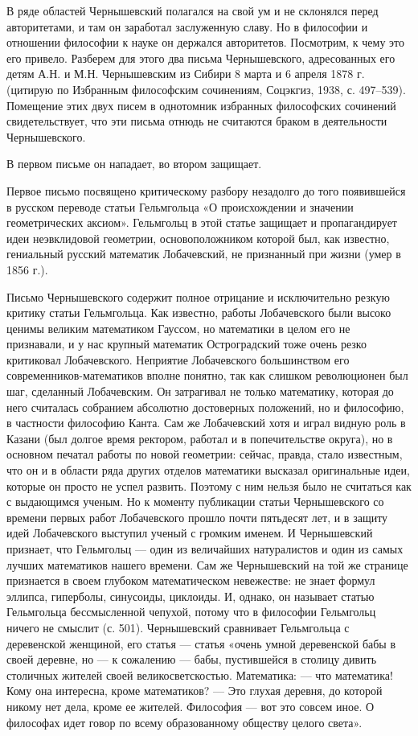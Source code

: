 В ряде областей Чернышевский полагался на свой ум и не склонялся перед
авторитетами, и там  он заработал заслуженную славу. Но  в философии и
отношении  философии к  науке  он держался  авторитетов. Посмотрим,  к
чему это  его привело.  Разберем для  этого два  письма Чернышевского,
адресованных его детям А.Н. и М.Н.  Чернышевским из Сибири 8 марта и 6
апреля 1878 г. (цитирую по Избранным философским сочинениям, Соцэкгиз,
1938, с. 497--539).  Помещение этих двух писем  в однотомник избранных
философских  сочинений  свидетельствует,  что  эти  письма  отнюдь  не
считаются браком в деятельности Чернышевского.

В первом письме он нападает, во втором защищает.

Первое  письмо  посвящено  критическому   разбору  незадолго  до  того
появившейся в  русском переводе статьи Гельмгольца  «О происхождении и
значении геометрических  аксиом». Гельмгольц в этой  статье защищает и
пропагандирует идеи  неэвклидовой геометрии,  основоположником которой
был,  как  известно,  гениальный  русский  математик  Лобачевский,  не
признанный при жизни (умер в 1856 г.).

Письмо Чернышевского содержит полное  отрицание и исключительно резкую
критику  статьи Гельмгольца.  Как известно,  работы Лобачевского  были
высоко ценимы великим  математиком Гауссом, но математики  в целом его
не  признавали, и  у нас  крупный математик  Остроградский тоже  очень
резко критиковал Лобачевского. Неприятие Лобачевского большинством его
современников-математиков вполне понятно, так как слишком революционен
был шаг,  сделанный Лобачевским.  Он затрагивал не  только математику,
которая до  него считалась собранием абсолютно  достоверных положений,
но и философию, в частности философию Канта. Сам же Лобачевский хотя и
играл  видную роль  в Казани  (был  долгое время  ректором, работал  и
в  попечительстве  округа), но  в  основном  печатал работы  по  новой
геометрии: сейчас,  правда, стало известным,  что он и в  области ряда
других  отделов  математики  высказал оригинальные  идеи,  которые  он
просто не успел развить. Поэтому с  ним нельзя было не считаться как с
выдающимся  ученым.  Но  к  моменту  публикации  статьи  Чернышевского
со  времени  первых работ  Лобачевского  прошло  почти пятьдесят  лет,
и  в  защиту  идей  Лобачевского выступил  ученый  с  громким  именем.
И  Чернышевский  признает,  что  Гельмгольц  ---  один  из  величайших
натуралистов и  один из самых  лучших математиков нашего  времени. Сам
же  Чернышевский  на  той  же странице  признается  в  своем  глубоком
математическом  невежестве:   не  знает  формул   эллипса,  гиперболы,
синусоиды,  циклоиды.  И,  однако,   он  называет  статью  Гельмгольца
бессмысленной  чепухой, потому  что в  философии Гельмгольц  ничего не
смыслит (с.  501). Чернышевский  сравнивает Гельмгольца  с деревенской
женщиной,  его  статья ---  статья  «очень  умной деревенской  бабы  в
своей  деревне, но  --- к  сожалению ---  бабы, пустившейся  в столицу
дивить столичных жителей своей  великосветскостью. Математика: --- что
математика!  Кому она  интересна,  кроме математиков?  --- Это  глухая
деревня, до которой  никому нет дела, кроме ее  жителей. Философия ---
вот это  совсем иное.  О философах идет  говор по  всему образованному
обществу целого света».

